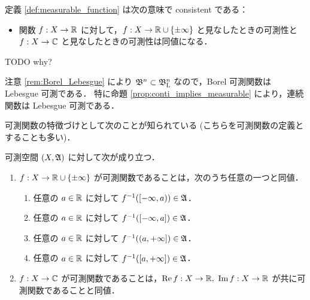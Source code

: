 \begin{remark}
    定義 \ref{def:measurable_function} は次の意味で consistent である：
    \begin{itemize}
        \item 関数 $f:X\to\mathbb{R}$ に対して，$f:X\to\mathbb{R}\cup\{\pm\infty\}$ と見なしたときの可測性と
        $f:X\to\mathbb{C}$ と見なしたときの可測性は同値になる．
    \end{itemize}
    {\color{red} TODO why?}
\end{remark}

\begin{remark}\label{rem:Borel_implies_Lebesgue}
    注意 \ref{rem:Borel_Lebesgue} により $\mathfrak{B}^n\subset\mathfrak{B}_{\mathrm{L}}^n$ なので，Borel 可測関数は Lebesgue 可測である．
    特に命題 \ref{prop:conti_implies_measurable} により，連続関数は Lebesgue 可測である．
\end{remark}

可測関数の特徴づけとして次のことが知られている (こちらを可測関数の定義とすることも多い)．

\begin{proposition}\label{prop:measurable_function_characterization}
    可測空間 $(X,\mathfrak{A})$ に対して次が成り立つ．
    \begin{enumerate}
        \item $f:X\to\mathbb{R}\cup\{\pm\infty\}$ が可測関数であることは，次のうち任意の一つと同値．
            \begin{enumerate}
                \item 任意の $a\in\mathbb{R}$ に対して $f^{-1}([-\infty,a))\in\mathfrak{A}$．
                \item 任意の $a\in\mathbb{R}$ に対して $f^{-1}([-\infty,a])\in\mathfrak{A}$．
                \item 任意の $a\in\mathbb{R}$ に対して $f^{-1}((a,+\infty])\in\mathfrak{A}$．
                \item 任意の $a\in\mathbb{R}$ に対して $f^{-1}([a,+\infty])\in\mathfrak{A}$．
            \end{enumerate}
        \item $f:X\to\mathbb{C}$ が可測関数であることは，$\operatorname{Re} f:X\to\mathbb{R},\ \operatorname{Im} f:X\to\mathbb{R}$ が共に可測関数であることと同値．
    \end{enumerate}
\end{proposition}

